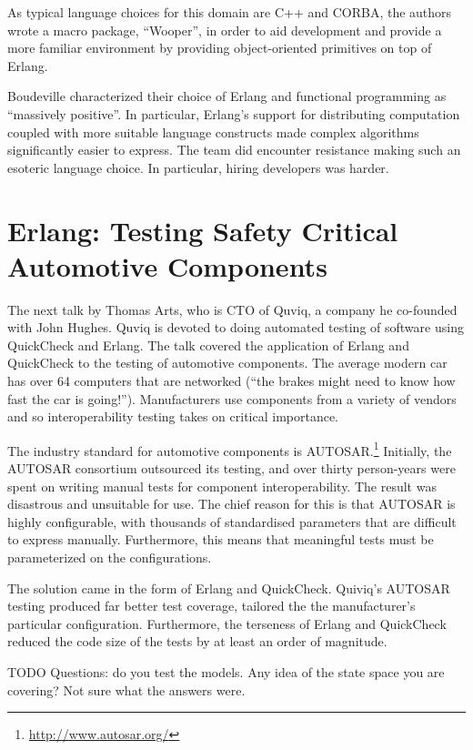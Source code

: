 \documentclass{jfp1}
\begin{document}
As typical language choices for this domain are C++ and CORBA, the
authors wrote a macro package, ``Wooper'', in order to aid development
and provide a more familiar environment by providing object-oriented
primitives on top of Erlang.

Boudeville characterized their choice of Erlang and functional
programming as ``massively positive''.  In particular, Erlang's support
for distributing computation coupled with more suitable language
constructs made complex algorithms significantly easier to express.  The
team did encounter resistance making such an esoteric language choice.
In particular, hiring developers was harder.

\section{Erlang: Testing Safety Critical Automotive Components}

The next talk by Thomas Arts, who is CTO of Quviq, a company he co-founded with John Hughes. Quviq is devoted to doing automated testing of
software using QuickCheck and Erlang.  The talk covered the application
of Erlang and QuickCheck to the testing of automotive components.  The
average modern car has over 64 computers that are networked (``the
brakes might need to know how fast the car is going!'').  Manufacturers
use components from a variety of vendors and so interoperability testing
takes on critical importance.

The industry standard for automotive components is AUTOSAR.\footnote{\url{http://www.autosar.org/}}
Initially, the AUTOSAR consortium outsourced its testing, and over thirty
person-years were spent on writing manual tests for component
interoperability.  The result was disastrous and unsuitable for use.
The chief reason for this is that AUTOSAR is highly configurable, with
thousands of standardised parameters that are difficult to express
manually.  Furthermore, this means that meaningful tests must be
parameterized on the configurations.

The solution came in the form of Erlang and QuickCheck.  Quiviq's
AUTOSAR testing produced far better test coverage, tailored the the
manufacturer's particular configuration.  Furthermore, the terseness of
Erlang and QuickCheck reduced the code size of the tests by at least an
order of magnitude.

TODO Questions: do you test the models.  Any idea of the state space you
are covering?  Not sure what the answers were.
\end{document}
